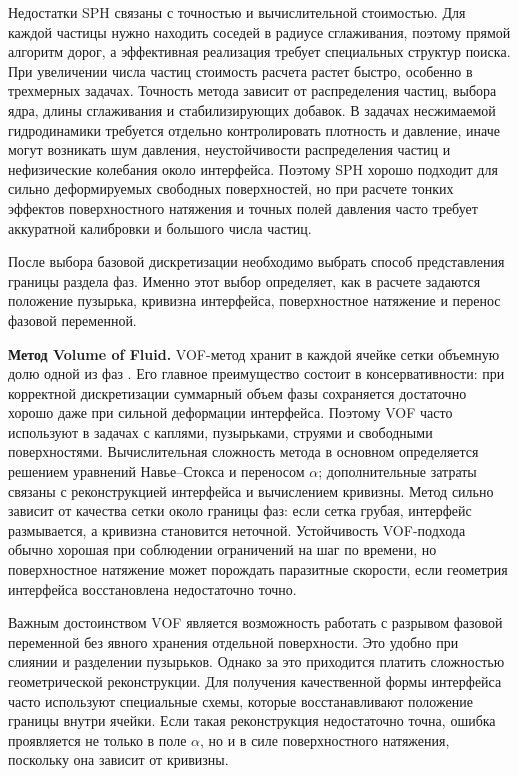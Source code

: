\documentclass[12pt,a4paper]{article}
\begin{document}
Недостатки SPH связаны с точностью и вычислительной стоимостью. Для каждой
частицы нужно находить соседей в радиусе сглаживания, поэтому прямой алгоритм
дорог, а эффективная реализация требует специальных структур поиска. При
увеличении числа частиц стоимость расчета растет быстро, особенно в трехмерных
задачах. Точность метода зависит от распределения частиц, выбора ядра,
длины сглаживания и стабилизирующих добавок. В задачах несжимаемой
гидродинамики требуется отдельно контролировать плотность и давление, иначе
могут возникать шум давления, неустойчивости распределения частиц и
нефизические колебания около интерфейса. Поэтому SPH хорошо подходит для
сильно деформируемых свободных поверхностей, но при расчете тонких эффектов
поверхностного натяжения и точных полей давления часто требует аккуратной
калибровки и большого числа частиц.

После выбора базовой дискретизации необходимо выбрать способ представления
границы раздела фаз. Именно этот выбор определяет, как в расчете задаются
положение пузырька, кривизна интерфейса, поверхностное натяжение и перенос
фазовой переменной.

\textbf{Метод Volume of Fluid.}
VOF-метод хранит в каждой ячейке сетки объемную долю одной из фаз
\cite{Hirt1981}. Его главное преимущество состоит в консервативности: при
корректной дискретизации суммарный объем фазы сохраняется достаточно хорошо
даже при сильной деформации интерфейса. Поэтому VOF часто используют в задачах
с каплями, пузырьками, струями и свободными поверхностями. Вычислительная
сложность метода в основном определяется решением уравнений Навье--Стокса и
переносом \(\alpha\); дополнительные затраты связаны с реконструкцией
интерфейса и вычислением кривизны. Метод сильно зависит от качества сетки около
границы фаз: если сетка грубая, интерфейс размывается, а кривизна становится
неточной. Устойчивость VOF-подхода обычно хорошая при соблюдении ограничений на
шаг по времени, но поверхностное натяжение может порождать паразитные скорости,
если геометрия интерфейса восстановлена недостаточно точно.

Важным достоинством VOF является возможность работать с разрывом фазовой
переменной без явного хранения отдельной поверхности. Это удобно при слиянии и
разделении пузырьков. Однако за это приходится платить сложностью
геометрической реконструкции. Для получения качественной формы интерфейса часто
используют специальные схемы, которые восстанавливают положение границы внутри
ячейки. Если такая реконструкция недостаточно точна, ошибка проявляется не
только в поле \(\alpha\), но и в силе поверхностного натяжения, поскольку она
зависит от кривизны.
\end{document}
